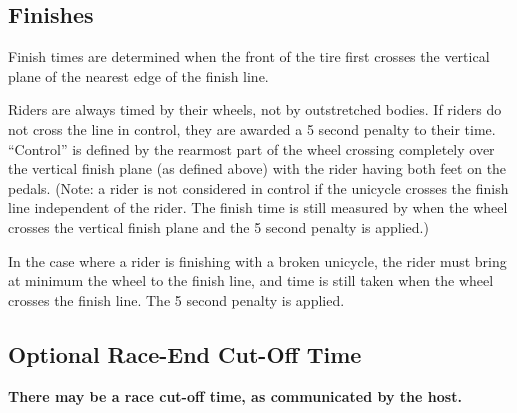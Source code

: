 \subsection{Finishes}

Finish times are determined when the front of the tire first crosses the vertical plane of the nearest edge of the finish line. 

Riders are always timed by their wheels, not by outstretched bodies.
If riders do not cross the line in control, they are awarded a 5 second penalty to their time.
``Control'' is defined by the rearmost part of the wheel crossing completely over the vertical finish plane (as defined above) with the rider having both feet on the pedals.
(Note: a rider is not considered in control if the unicycle crosses the finish line independent of the rider.
The finish time is still measured by when the wheel crosses the vertical finish plane and the 5 second penalty is applied.)

In the case where a rider is finishing with a broken unicycle, the rider must bring at minimum the wheel to the finish line, and time is still taken when the wheel crosses the finish line.
The 5 second penalty is applied.

\subsection{Optional Race-End Cut-Off Time}

\textbf{There may be a race cut-off time, as communicated by the host.}
